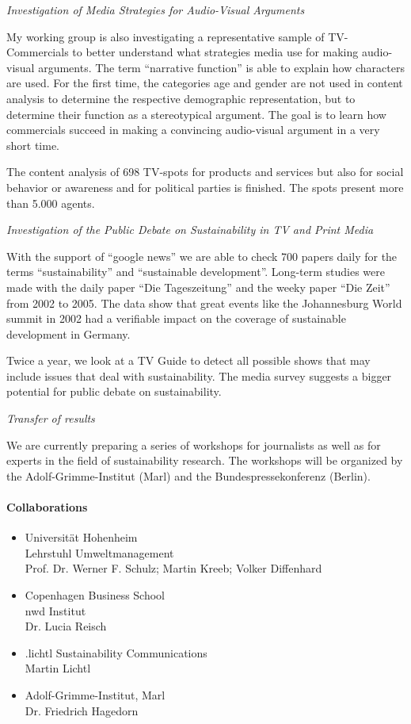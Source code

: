 \textit{Investigation of Media Strategies for Audio-Visual Arguments}

 My working group is also investigating a representative sample of TV-Commercials to better understand what strategies media use for making audio-visual arguments. The term ``narrative function'' is able to explain how characters are used. For the first time, the categories age and gender are not used in content analysis to determine the respective demographic representation, but to determine their function as a stereotypical argument. The goal is to learn how commercials succeed in making a convincing audio-visual argument in a very short time.

 The content analysis of 698 TV-spots for products and services but also for social behavior or awareness and for political parties is finished. The spots present more than 5.000 agents.

\textit{Investigation of the Public Debate on Sustainability in TV and Print Media}

 With the support of ``google news'' we are able to check 700 papers daily for the terms ``sustainability'' and ``sustainable development''. Long-term studies were made with the daily paper ``Die Tageszeitung'' and the weeky paper ``Die Zeit'' from 2002 to 2005. The data show that great events like the Johannesburg World summit in 2002 had a verifiable impact on the coverage of sustainable development in Germany.

 Twice a year, we look at a TV Guide to detect all possible shows that may include issues that deal with sustainability. The media survey suggests a bigger potential for public debate on sustainability.

\newpage
\textit{Transfer of results}

 We are currently preparing a series of workshops for journalists as well as for experts in the field of sustainability research. The workshops will be organized by the Adolf-Grimme-Institut (Marl) and the Bundespressekonferenz (Berlin). 


\paragraph{Collaborations}
\begin{itemize}
\item Universit\"at Hohenheim \\ Lehrstuhl Umweltmanagement \\ Prof. Dr. Werner F. Schulz; Martin Kreeb; Volker Diffenhard 
\item Copenhagen Business School \\ nwd Institut \\ Dr. Lucia Reisch 
\item .lichtl Sustainability Communications \\ Martin Lichtl
\item Adolf-Grimme-Institut, Marl \\ Dr. Friedrich Hagedorn 
\end{itemize}

